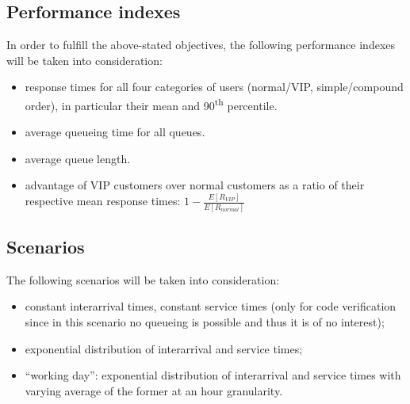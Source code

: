 \subsection{Performance indexes}
In order to fulfill the above-stated objectives, the following performance 
indexes will be taken into consideration:
\begin{itemize}
    \item response times for all four categories of users (normal/VIP, 
    simple/compound order), in particular their mean and 90\textsuperscript{th} 
    percentile.
    \item average queueing time for all queues.
    \item average queue length.
    \item advantage of VIP customers over normal customers as a ratio of their respective mean response times: $1-{\frac{E[R_{VIP}]}{E[R_{normal}]}}$
\end{itemize}

\subsection{Scenarios}
The following scenarios will be taken into consideration:
\begin{itemize}
    \item constant interarrival times, constant service times (only for code verification since in this scenario no queueing is possible and thus it is of no interest);
    \item exponential distribution of interarrival and service times;
    \item ``working day'': exponential distribution of interarrival and service times with varying average of the former at an hour granularity.
\end{itemize}
